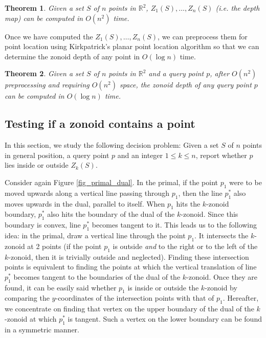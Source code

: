 \documentclass[charterfonts,lotsofwhite]{patmorin}
\newtheorem{theorem}{Theorem}
\begin{document}
\begin{theorem}\label{theorem_build_1_to_n_zonoids}
Given a set $S$ of $n$ points in $\mathbb{R}^2$,
$Z_1(S),\ldots,Z_n(S)$ (i.e. the depth map) can be computed in $O(n^2)$ time.
\end{theorem}

Once we have computed the $Z_1(S),\ldots,Z_n(S)$, we can preprocess them for point location using Kirkpatrick's planar point location algorithm \cite{optimal_search_in_planar_subdivisions} so that we can determine the zonoid depth of any point in $O(\log n)$ time. 

\begin{theorem}\label{theorem_point_location}
Given a set $S$ of $n$ points in $\mathbb{R}^2$ and a query point $p$,
after $O(n^2)$ preprocessing and requiring $O(n^2)$ space, the zonoid
depth of any query point $p$ can be computed in $O(\log n)$ time.
\end{theorem}

\subsection{Testing if a zonoid contains a point}\label{subsection_testing_if_a_zonoid_contains_a_point}

In this section, we study the following decision problem: Given a set
$S$ of $n$ points in general position, a query point $p$ and an
integer $1 \le k \le n$, report whether $p$ lies inside or outside
$Z_k(S)$. 

Consider again Figure \ref{fig_primal_dual}. In the primal, if the
point $p_1$ were to be moved upwards along a vertical line passing
through $p_1$, then the line $p_1^*$ also moves upwards in the dual,
parallel to itself. When $p_1$ hits the $k$-zonoid boundary, $p_1^*$
also hits the boundary of the dual of the $k$-zonoid. Since this
boundary is convex, line $p_1^*$ becomes tangent to it. This leads us
to the following idea: in the primal, draw a vertical line through the
point $p_1$. It intersects the $k$-zonoid at 2 points (if the point
$p_1$ is outside \emph{and} to the right or to the left of the
$k$-zonoid, then it is trivially outside and neglected). Finding these
intersection points is equivalent to finding the points at which the
vertical translation of line $p_1^*$ becomes tangent to the boundaries
of the dual of the $k$-zonoid. Once they are found, it can be easily
said whether $p_1$ is inside or outside the $k$-zonoid by comparing
the $y$-coordinates of the intersection points with that of  $p_1$.
Hereafter, we concentrate on finding that vertex on the upper boundary
of the dual of the $k$-zonoid at which $p_1^*$ is tangent. Such a
vertex on the lower boundary can be found in a symmetric manner. 
\end{document}
